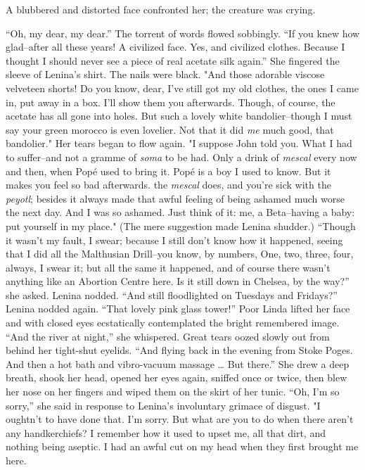 \documentclass[12pt]{report}
\begin{document}
A blubbered and distorted face confronted her; the creature was crying.

``Oh, my dear, my dear.'' The torrent of words flowed sobbingly. ``If
you knew how glad--after all these years! A civilized face. Yes, and
civilized clothes. Because I thought I should never see a piece of real
acetate silk again.'' She fingered the sleeve of Lenina's shirt. The
nails were black. "And those adorable viscose velveteen shorts! Do you
know, dear, I've still got my old clothes, the ones I came in, put away
in a box. I'll show them you afterwards. Though, of course, the acetate
has all gone into holes. But such a lovely white bandolier--though I
must say your green morocco is even lovelier. Not that it did \emph{me}
much good, that bandolier." Her tears began to flow again. "I suppose
John told you. What I had to suffer--and not a gramme of \emph{soma} to
be had. Only a drink of \emph{mescal} every now and then, when Popé used
to bring it. Popé is a boy I used to know. But it makes you feel so bad
afterwards. the \emph{mescal} does, and you're sick with the
\emph{peyotl}; besides it always made that awful feeling of being
ashamed much worse the next day. And I was so ashamed. Just think of it:
me, a Beta--having a baby: put yourself in my place." (The mere
suggestion made Lenina shudder.) ``Though it wasn't my fault, I swear;
because I still don't know how it happened, seeing that I did all the
Malthusian Drill--you know, by numbers, One, two, three, four, always, I
swear it; but all the same it happened, and of course there wasn't
anything like an Abortion Centre here. Is it still down in Chelsea, by
the way?'' she asked. Lenina nodded. ``And still floodlighted on
Tuesdays and Fridays?'' Lenina nodded again. ``That lovely pink glass
tower!'' Poor Linda lifted her face and with closed eyes ecstatically
contemplated the bright remembered image. ``And the river at night,''
she whispered. Great tears oozed slowly out from behind her tight-shut
eyelids. ``And flying back in the evening from Stoke Poges. And then a
hot bath and vibro-vacuum massage \ldots{} But there.'' She drew a deep
breath, shook her head, opened her eyes again, sniffed once or twice,
then blew her nose on her fingers and wiped them on the skirt of her
tunic. ``Oh, I'm so sorry,'' she said in response to Lenina's
involuntary grimace of disgust. "I oughtn't to have done that. I'm
sorry. But what are you to do when there aren't any handkerchiefs? I
remember how it used to upset me, all that dirt, and nothing being
aseptic. I had an awful cut on my head when they first brought me here.
\end{document}
